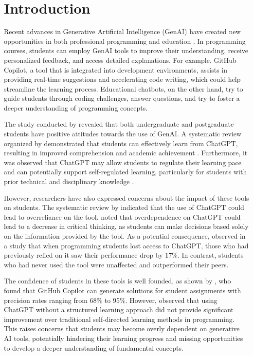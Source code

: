 \documentclass[sn-apa]{sn-jnl} %
\begin{document}
\maketitle

\section{Introduction}\label{sec1}

Recent advances in Generative Artificial Intelligence (GenAI) have created
new opportunities in both professional programming and education \citep{Puryear22}.
In programming courses, students can employ GenAI tools to improve their
understanding, receive personalized feedback, and access detailed explanations.
For example, GitHub Copilot, a tool that is integrated into development
environments, assists in providing real-time suggestions and accelerating code
writing, which could help streamline the learning process. Educational chatbots,
on the other hand, try to guide students through coding challenges, answer
questions, and try to foster a deeper understanding of programming concepts.

The study conducted by \cite{chan23} revealed that both undergraduate and
postgraduate students have positive attitudes towards the use of GenAI.
A systematic review organized by \cite{Lo24} demonstrated that students can
effectively learn from ChatGPT, resulting in improved comprehension and academic
achievement \citep{Callejo24}. Furthermore, it was observed that ChatGPT may
allow students to regulate their learning pace and can potentially support
self-regulated learning, particularly for students with prior technical and
disciplinary knowledge \citep{Xia23}.

However, researchers have also expressed concerns about the impact of these
tools on students. The systematic review by \cite{Murillo23} indicated that the
use of ChatGPT could lead to overreliance on the tool. \cite{chan23} noted that
overdependence on ChatGPT could lead to a decrease in critical thinking, as
students can make decisions based solely on the information provided by the
tool. As a potential consequence, \cite{Bastani24} observed in a study that when
programming students lost access to ChatGPT, those who had previously relied
on it saw their performance drop by 17\%. In contrast, students who had never
used the tool were unaffected and outperformed their peers.

The confidence of students in these tools is well founded, as shown by
\cite{Puryear22}, who found that GitHub Copilot can generate solutions for
student assignments with precision rates ranging from 68\% to 95\%. However,
\cite{Boudouaia24} observed that using ChatGPT without a structured learning
approach did not provide significant improvement over traditional self-directed
learning methods in programming. This raises concerns that students may become
overly dependent on generative AI tools, potentially hindering their learning
progress and missing opportunities to develop a deeper understanding of
fundamental concepts.
\end{document}

